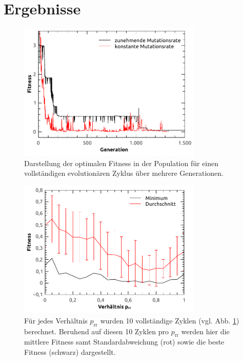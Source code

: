 \documentclass[12pt,
    a4paper,
    headinclude,
    footinclude]{scrartcl}
\begin{document}
	\section{Ergebnisse}
	
	\newcommand{\size}{0.78}
	\begin{figure}[!h]
		\begin{center}
			\includegraphics[width=\size\textwidth]{../vortrag/abbildungen/oneCycleAnalysis.pdf}
			\caption{Darstellung der optimalen Fitness in der Population für einen vollständigen evolutionären Zyklus über mehrere Generationen.}
			\label{fig_onecycle}
		\end{center}
	\vspace{-1.cm}
	
	\end{figure}
	\begin{figure}[!h]
		\begin{center}
			\includegraphics[width=\size\textwidth]{../vortrag/abbildungen/n4_gemittelt_minimal_increasing.pdf}
			\caption{Für jedes Verhältnis $p_\text{rr}$ wurden 10 vollständige Zyklen (vgl. Abb. \ref{fig_onecycle}) berechnet. Beruhend auf diesen 10 Zyklen pro $p_\text{rr}$ werden hier die mittlere Fitness samt Standardabweichung (rot) sowie die beste Fitness (schwarz) dargestellt.}
		\end{center}
	\end{figure}
	\newpage
	
\end{document}
